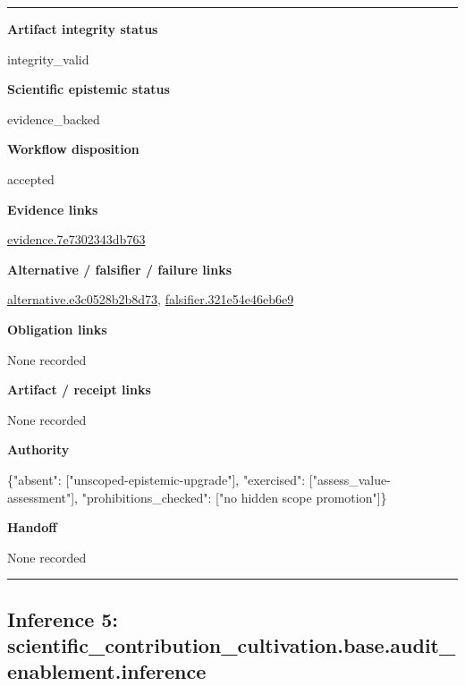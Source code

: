 \documentclass[10pt,a4paper]{article}
\newcommand{\TraceField}[2]{\par\noindent\textbf{#1}\par\noindent #2\par\smallskip}
\newenvironment{TraceDossier}{\par\medskip\noindent\hrule\medskip}{\medskip\hrule\par\medskip}
\begin{document}
\begin{TraceDossier}
\TraceField{Artifact integrity status}{integrity\_\allowbreak{}valid}

\TraceField{Scientific epistemic status}{evidence\_\allowbreak{}backed}

\TraceField{Workflow disposition}{accepted}

\TraceField{Evidence links}{\hyperlink{trace-evidence-926063073b3481da1e}{evidence.\allowbreak{}7e7302343d\allowbreak{}b763}}

\TraceField{Alternative / falsifier / failure links}{\hyperlink{trace-alternative-2dd33d87817b7082dd}{alternativ\allowbreak{}e.\allowbreak{}e3c0528b2b\allowbreak{}8d73}, \hyperlink{trace-alternative-ba2988bc2e7bb66934}{falsifier.\allowbreak{}321e54e46e\allowbreak{}b6e9}}

\TraceField{Obligation links}{None recorded}

\TraceField{Artifact / receipt links}{None recorded}

\TraceField{Authority}{\{"absent":\allowbreak{} ["unscoped\allowbreak{}-\allowbreak{}epistemic-\allowbreak{}upgrade"],\allowbreak{} "exercised\allowbreak{}":\allowbreak{} ["assess\_\allowbreak{}value-\allowbreak{}assessment\allowbreak{}"], "prohibiti\allowbreak{}ons\_\allowbreak{}checked":\allowbreak{} ["no hidden scope promotion"\allowbreak{}]\}}

\TraceField{Handoff}{None recorded}

\end{TraceDossier}
\pagebreak[2]\subsection{Inference 5: scientific\allowbreak{}\_\allowbreak{}contributi\allowbreak{}on\_\allowbreak{}cultivatio\allowbreak{}n.\allowbreak{}base.\allowbreak{}audit\_\allowbreak{}enablement\allowbreak{}.\allowbreak{}inference}\label{trace-inference-912939f41ee5a5677d}
\end{document}
